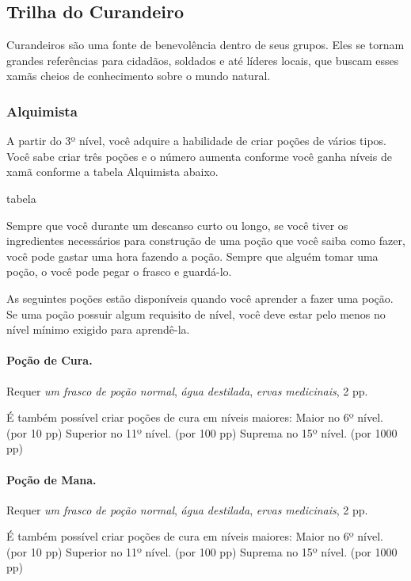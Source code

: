 \begin{multicols}{2}
\subsection*{Trilha do Curandeiro}%

Curandeiros são uma fonte de benevolência dentro de seus grupos. Eles se tornam
grandes referências para cidadãos, soldados e até líderes locais, que buscam
esses xamãs cheios de conhecimento sobre o mundo natural.

\subsubsection*{Alquimista}%

A partir do 3º nível, você adquire a habilidade de criar poções de vários
tipos. Você sabe criar três poções e o número aumenta conforme você ganha níveis
de xamã conforme a tabela Alquimista abaixo.

tabela

Sempre que você durante um descanso curto ou longo, se você tiver os
ingredientes necessários para construção de uma poção que você saiba como fazer,
você pode gastar uma hora fazendo a poção. Sempre que alguém tomar uma poção, o
você pode pegar o frasco e guardá-lo.

As seguintes poções estão disponíveis quando você aprender a fazer uma poção. Se
uma poção possuir algum requisito de nível, você deve estar pelo menos no nível
mínimo exigido para aprendê-la.

\paragraph{Poção de Cura.} %

Requer \textit{um frasco de poção normal}, \textit{água destilada},
\textit{ervas medicinais}, 2 pp.

É também possível criar poções de cura em níveis maiores: \nl
Maior no 6º nível. (por 10 pp) \nl
Superior no 11º nível. (por 100 pp) \nl
Suprema no 15º nível. (por 1000 pp) \nl

\paragraph{Poção de Mana.}%

Requer \textit{um frasco de poção normal}, \textit{água destilada},
\textit{ervas medicinais}, 2 pp.

É também possível criar poções de cura em níveis maiores: \nl
Maior no 6º nível. (por 10 pp) \nl
Superior no 11º nível. (por 100 pp) \nl
Suprema no 15º nível. (por 1000 pp) \nl


\end{multicols}
